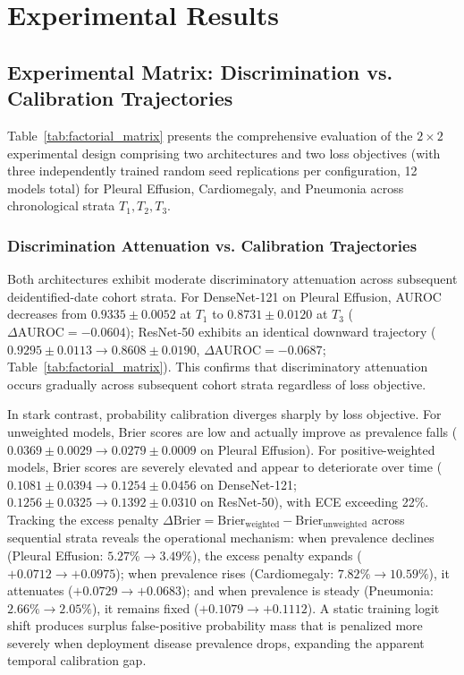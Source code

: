 \documentclass[preprint,12pt]{elsarticle}
\begin{document}
\section{Experimental Results}

\subsection{Experimental Matrix: Discrimination vs. Calibration Trajectories}
Table~\ref{tab:factorial_matrix} presents the comprehensive evaluation of the $2 \times 2$ experimental design comprising two architectures and two loss objectives (with three independently trained random seed replications per configuration, 12 models total) for Pleural Effusion, Cardiomegaly, and Pneumonia across chronological strata $T_1, T_2, T_3$.

\subsubsection{Discrimination Attenuation vs. Calibration Trajectories}
Both architectures exhibit moderate discriminatory attenuation across subsequent deidentified-date cohort strata. For DenseNet-121 on Pleural Effusion, AUROC decreases from $0.9335 \pm 0.0052$ at $T_1$ to $0.8731 \pm 0.0120$ at $T_3$ ($\Delta\text{AUROC} = -0.0604$); ResNet-50 exhibits an identical downward trajectory ($0.9295 \pm 0.0113 \to 0.8608 \pm 0.0190$, $\Delta\text{AUROC} = -0.0687$; Table~\ref{tab:factorial_matrix}). This confirms that discriminatory attenuation occurs gradually across subsequent cohort strata regardless of loss objective.

In stark contrast, probability calibration diverges sharply by loss objective. For unweighted models, Brier scores are low and actually improve as prevalence falls ($0.0369 \pm 0.0029 \to 0.0279 \pm 0.0009$ on Pleural Effusion). For positive-weighted models, Brier scores are severely elevated and appear to deteriorate over time ($0.1081 \pm 0.0394 \to 0.1254 \pm 0.0456$ on DenseNet-121; $0.1256 \pm 0.0325 \to 0.1392 \pm 0.0310$ on ResNet-50), with ECE exceeding 22\%. Tracking the excess penalty $\Delta\text{Brier} = \text{Brier}_{\text{weighted}} - \text{Brier}_{\text{unweighted}}$ across sequential strata reveals the operational mechanism: when prevalence declines (Pleural Effusion: $5.27\% \to 3.49\%$), the excess penalty expands ($+0.0712 \to +0.0975$); when prevalence rises (Cardiomegaly: $7.82\% \to 10.59\%$), it attenuates ($+0.0729 \to +0.0683$); and when prevalence is steady (Pneumonia: $2.66\% \to 2.05\%$), it remains fixed ($+0.1079 \to +0.1112$). A static training logit shift produces surplus false-positive probability mass that is penalized more severely when deployment disease prevalence drops, expanding the apparent temporal calibration gap.
\end{document}
